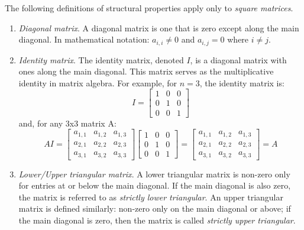 \noindent The following definitions of structural properties apply only to \emph{square matrices}.
\begin{enumerate}[resume]

\item \emph{Diagonal matrix}.  A diagonal matrix is one that is zero except along the main diagonal. In mathematical notation: $a_{i,i} \ne 0 $ and $a_{i,j} = 0$ where $i \ne j$.

\item \emph{Identity matrix}.  The identity matrix, denoted $I$, is a diagonal matrix with ones along the main diagonal.  This matrix serves as the multiplicative identity in matrix algebra.  For example, for $n=3$, the identity matrix is:
\begin{equation*}
I = \left[
\begin{matrix}
1 & 0 & 0 \\
0 & 1 & 0 \\
0 & 0 & 1
\end{matrix}
\right]
\end{equation*}
and, for any 3x3 matrix A:
\begin{equation*}
AI = \left[
\begin{matrix}
a_{1,1} & a_{1,2} & a_{1,3} \\
a_{2,1} & a_{2,2} & a_{2,3} \\
a_{3,1} & a_{3,2} & a_{3,3}
\end{matrix}
\right]
\left[
\begin{matrix}
1 & 0 & 0 \\
0 & 1 & 0 \\
0 & 0 & 1
\end{matrix}
\right]
=
\left[
\begin{matrix}
a_{1,1} & a_{1,2} & a_{1,3} \\
a_{2,1} & a_{2,2} & a_{2,3} \\
a_{3,1} & a_{3,2} & a_{3,3}
\end{matrix}
\right]
= 
A
\end{equation*}

\item \emph{Lower/Upper triangular matrix}.  A lower triangular matrix is non-zero only for entries at or below the main diagonal.  If the main diagonal is also zero, the matrix is referred to as \emph{strictly lower triangular}.  An upper triangular matrix is defined similarly: non-zero only on the main diagonal or above; if the main diagonal is zero, then the matrix is called \emph{strictly upper triangular}.
\end{enumerate}

